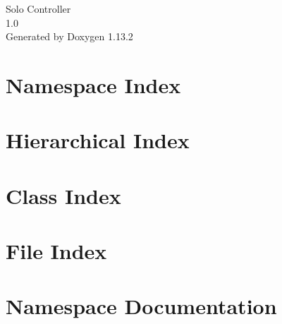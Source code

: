 \documentclass[twoside]{book}
\newcommand{\+}{\discretionary{\mbox{\scriptsize$\hookleftarrow$}}{}{}}
\newcommand{\clearemptydoublepage}{%
    \newpage{\pagestyle{empty}\cleardoublepage}%
  }
\begin{document}
  \raggedbottom
    \hypersetup{pageanchor=false,
                bookmarksnumbered=true,
                pdfencoding=unicode
               }
  \begin{titlepage}
  \vspace*{7cm}
  \begin{center}%
  {\Large Solo Controller}\\
  [1ex]\large 1.\+0 \\
  \vspace*{1cm}
  {\large Generated by Doxygen 1.13.2}\\
  \end{center}
  \end{titlepage}
  \clearemptydoublepage
  \tableofcontents
  \clearemptydoublepage
  \hypersetup{pageanchor=true}

\chapter{Namespace Index}

\chapter{Hierarchical Index}

\chapter{Class Index}

\chapter{File Index}

\chapter{Namespace Documentation}



















\end{document}
